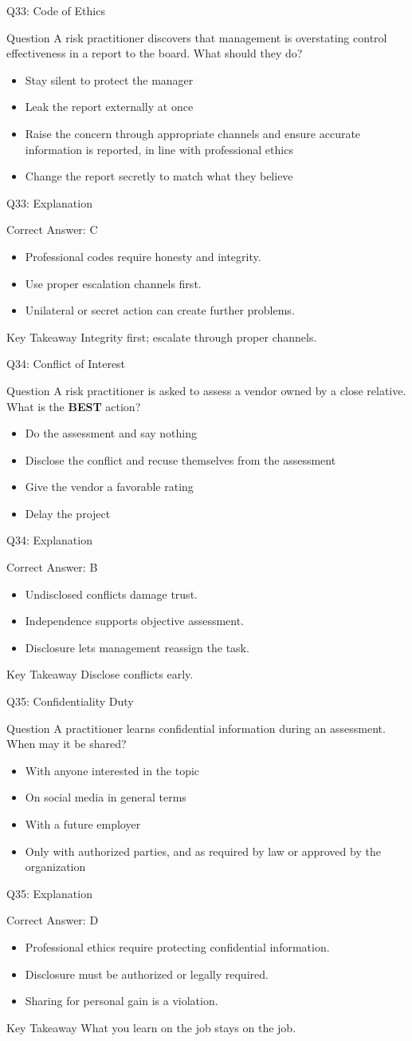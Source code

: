 \documentclass[aspectratio=169]{beamer}
\newcommand{\hq}[7]{%
	\begin{frame}{Q#1: #2}
		\begin{block}{Question}
			#3
		\end{block}
		\begin{itemize}
			#4
		\end{itemize}
	\end{frame}
	\begin{frame}{Q#1: Explanation}
		\begin{block}{Correct Answer: #5}
			\begin{itemize}
				#6
			\end{itemize}
		\end{block}
		\begin{alertblock}{Key Takeaway}
			#7
		\end{alertblock}
	\end{frame}
}
\begin{document}
	\hq{33}{Code of Ethics}
	{A risk practitioner discovers that management is overstating control effectiveness in a report to the board. What should they do?}
	{\item[\textbf{(A)}] Stay silent to protect the manager
		\item[\textbf{(B)}] Leak the report externally at once
		\item[\textbf{(C)}] Raise the concern through appropriate channels and ensure accurate information is reported, in line with professional ethics
		\item[\textbf{(D)}] Change the report secretly to match what they believe}
	{C}
	{\item Professional codes require honesty and integrity.
		\item Use proper escalation channels first.
		\item Unilateral or secret action can create further problems.}
	{Integrity first; escalate through proper channels.}
	
	\hq{34}{Conflict of Interest}
	{A risk practitioner is asked to assess a vendor owned by a close relative. What is the \textbf{BEST} action?}
	{\item[\textbf{(A)}] Do the assessment and say nothing
		\item[\textbf{(B)}] Disclose the conflict and recuse themselves from the assessment
		\item[\textbf{(C)}] Give the vendor a favorable rating
		\item[\textbf{(D)}] Delay the project}
	{B}
	{\item Undisclosed conflicts damage trust.
		\item Independence supports objective assessment.
		\item Disclosure lets management reassign the task.}
	{Disclose conflicts early.}
	
	\hq{35}{Confidentiality Duty}
	{A practitioner learns confidential information during an assessment. When may it be shared?}
	{\item[\textbf{(A)}] With anyone interested in the topic
		\item[\textbf{(B)}] On social media in general terms
		\item[\textbf{(C)}] With a future employer
		\item[\textbf{(D)}] Only with authorized parties, and as required by law or approved by the organization}
	{D}
	{\item Professional ethics require protecting confidential information.
		\item Disclosure must be authorized or legally required.
		\item Sharing for personal gain is a violation.}
	{What you learn on the job stays on the job.}
	
\end{document}
